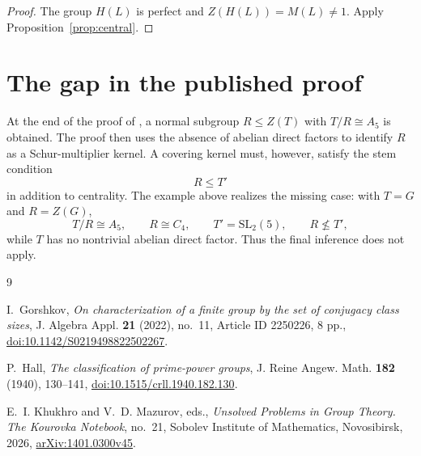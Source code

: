 \documentclass[11pt]{amsart}
\theoremstyle{remark}
\begin{document}
\begin{proof}
The group \(H(L)\) is perfect and
\(Z(H(L))=M(L)\ne1\).  Apply Proposition~\ref{prop:central}.
\end{proof}

\section*{The gap in the published proof}

At the end of the proof of \cite[Theorem~1]{Gorshkov}, a normal subgroup
\(R\le Z(T)\) with \(T/R\cong A_5\) is obtained.  The proof then uses the
absence of abelian direct factors to identify \(R\) as a Schur-multiplier
kernel.  A covering kernel must, however, satisfy the stem condition
\[
R\le T'
\]
in addition to centrality.  The example above realizes the missing case:
with \(T=G\) and \(R=Z(G)\),
\[
T/R\cong A_5,\qquad R\cong C_4,\qquad
T'=\mathrm{SL}_2(5),\qquad R\nleq T',
\]
while \(T\) has no nontrivial abelian direct factor.  Thus the final
inference does not apply.

\begin{thebibliography}{9}

I.~Gorshkov,
\emph{On characterization of a finite group by the set of conjugacy class
sizes},
J. Algebra Appl. \textbf{21} (2022), no.~11, Article ID 2250226, 8 pp.,
\href{https://doi.org/10.1142/S0219498822502267}
{doi:10.1142/S0219498822502267}.

P.~Hall,
\emph{The classification of prime-power groups},
J. Reine Angew. Math. \textbf{182} (1940), 130--141,
\href{https://doi.org/10.1515/crll.1940.182.130}
{doi:10.1515/crll.1940.182.130}.

E.~I. Khukhro and V.~D. Mazurov, eds.,
\emph{Unsolved Problems in Group Theory. The Kourovka Notebook},
no.~21, Sobolev Institute of Mathematics, Novosibirsk, 2026,
\href{https://arxiv.org/abs/1401.0300v45}{arXiv:1401.0300v45}.

\end{thebibliography}
\end{document}
